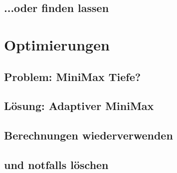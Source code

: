 \documentclass[12pt, draft]{beamer}
\begin{document}
\subsection{...oder finden lassen}
\begin{frame}
\end{frame}

\section{Optimierungen}
\subsection{Problem: MiniMax Tiefe?}
\begin{frame}
\end{frame}
\subsection{Lösung: Adaptiver MiniMax}
\begin{frame}
\end{frame}
\subsection{Berechnungen wiederverwenden}
\begin{frame}
\end{frame}
\subsection{und notfalls löschen}
\begin{frame}
\end{frame}
\end{document}
